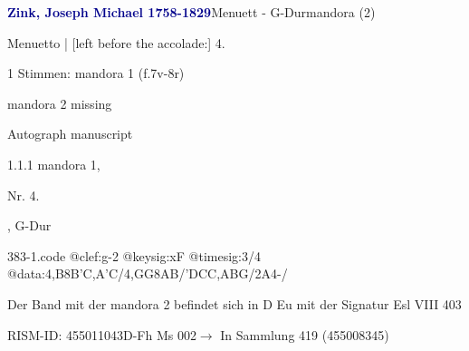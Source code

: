 \documentclass[twocolumn, 12pt]{book}
\begin{document}
\par \vspace{16pt} \textcolor{darkblue}{\textbf{Zink, Joseph Michael  1758-1829}}\hfillplus{\textbf{[383]}}\newline Menuett - G-Dur\newline mandora (2)
\par \begin{itshape}[f.7v, at left:] Menuetto | [left before the accolade:] 4.\end{itshape} 
\par \textcolor{darkblue}{}  1 Stimmen: mandora 1  (f.7v-8r)\newline \begin{small} mandora 2 missing\end{small} \newline Autograph manuscript
\par 1.1.1  mandora 1, \begin{itshape}Nr. 4.\end{itshape}, G-Dur  
\begin{filecontents*}{383-1.code}
@clef:g-2
@keysig:xF
@timesig:3/4
@data:4,B8B'C,A'C/4,GG{8AB}/'DCC,ABG/2A4-/
\end{filecontents*}
\newline %
\par Der Band mit der mandora 2 befindet sich in D Eu mit der Signatur Esl VIII 403
\par RISM-ID: 455011043\newline D-Fh  Ms 002\newline $\rightarrow$ In Sammlung 419 (455008345)
      
\end{document}
